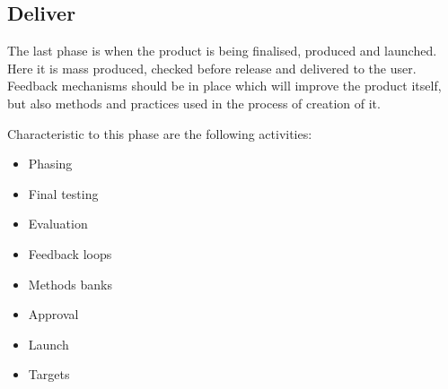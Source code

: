 		\subsection{Deliver}

The last phase is when the product is being finalised, produced and launched. Here it is mass produced, checked before release and delivered to the user. Feedback mechanisms should be in place which will improve the product itself, but also methods and practices used in the process of creation of it.

Characteristic to this phase are the following activities:
\begin{itemize}
\item Phasing
\item Final testing
\item Evaluation
\item Feedback loops
\item Methods banks
\item Approval
\item Launch
\item Targets
\end{itemize}



